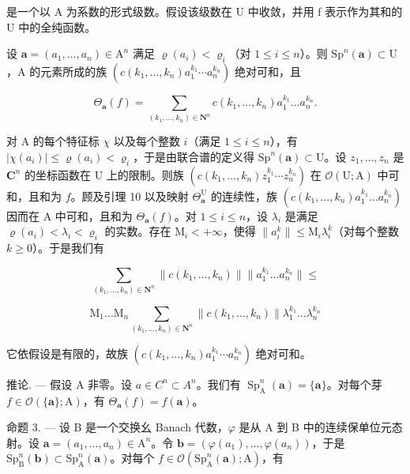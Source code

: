 是一个以 A 为系数的形式级数。假设该级数在 U 中收敛，并用 f 表示作为其和的 U 中的全纯函数。

设 \(\boldsymbol{a}=(a_{1},\ldots,a_{n})\in\mathrm{A}^{n}\) 满足 \(\varrho(a_{i})<\varrho_{i}\)（对 \(1\leqslant i\leqslant n\)）。则 \(\mathrm{Sp}^{n}(\boldsymbol{a})\subset\mathrm{U}\)，A 的元素所成的族 \((c(k_{1},\ldots,k_{n})a_{1}^{k_{1}}\cdots a_{n}^{k_{n}})\) 绝对可和，且

\[
\Theta_ {\boldsymbol {a}} (f) = \sum_ {(k _ {1}, \dots , k _ {n}) \in \mathbf {N} ^ {n}} c (k _ {1}, \dots , k _ {n}) a _ {1} ^ {k _ {1}} \dots a _ {n} ^ {k _ {n}}.
\]

对 A 的每个特征标 \(\chi\) 以及每个整数 \(i\)（满足 \(1 \leqslant i \leqslant n\)），有 \(|\chi(a_i)| \leqslant \varrho(a_i) < \varrho_i\)，于是由联合谱的定义得 \(\mathrm{Sp}^n(\boldsymbol{a}) \subset \mathrm{U}\)。设 \(z_1, \ldots, z_n\) 是 \(\mathbf{C}^n\) 的坐标函数在 U 上的限制。则族 \((c(k_1, \ldots, k_n)z_1^{k_1} \cdots z_n^{k_n})\) 在 \(\mathcal{O}(\mathrm{U}; \mathrm{A})\) 中可和，且和为 \(f\)。顾及引理 10 以及映射 \(\Theta_{\boldsymbol{a}}^{\mathrm{U}}\) 的连续性，族 \((c(k_1, \ldots, k_n)a_1^{k_1} \ldots a_n^{k_n})\) 因而在 A 中可和，且和为 \(\Theta_{\boldsymbol{a}}(f)\)。对 \(1 \leqslant i \leqslant n\)，设 \(\lambda_i\) 是满足 \(\varrho(a_i) < \lambda_i < \varrho_i\) 的实数。存在 \(\mathrm{M}_i < +\infty\)，使得 \(\|a_i^k\| \leqslant \mathrm{M}_i\lambda_i^k\)（对每个整数 \(k \geqslant 0\)）。于是我们有

\[
\sum_ {(k _ {1}, \dots , k _ {n}) \in \mathbf {N} ^ {n}} \| c (k _ {1}, \dots , k _ {n}) \| \| a _ {1} ^ {k _ {1}} \dots a _ {n} ^ {k _ {n}} \| \leqslant
\]

\[
\mathrm{M} _ {1} \dots \mathrm{M} _ {n} \sum_ {(k _ {1}, \dots , k _ {n}) \in \mathbf {N} ^ {n}} \| c (k _ {1}, \dots , k _ {n}) \| \lambda_ {1} ^ {k _ {1}} \dots \lambda_ {n} ^ {k _ {n}}
\]

它依假设是有限的，故族 \((c(k_{1},\ldots,k_{n})a_{1}^{k_{1}}\cdots a_{n}^{k_{n}})\) 绝对可和。

推论. --- 假设 A 非零。设 \(a \in C^{n} \subset A^{n}\)。我们有 \(\operatorname{Sp}_{\mathrm{A}}^{n}(\boldsymbol{a}) = \{\boldsymbol{a}\}\)。对每个芽 \(f \in \mathcal{O}(\{\boldsymbol{a}\}; \mathrm{A})\)，有 \(\Theta_{\boldsymbol{a}}(f) = f(\boldsymbol{a})\)。

命题 3. --- 设 B 是一个交换幺 Banach 代数，\(\varphi\) 是从 A 到 B 中的连续保单位元态射。设 \(\boldsymbol{a} = (a_1, \ldots, a_n) \in \mathrm{A}^n\)。令 \(\boldsymbol{b} = (\varphi(a_1), \ldots, \varphi(a_n))\)，于是 \(\mathrm{Sp}_{\mathrm{B}}^{n}(\boldsymbol{b}) \subset \mathrm{Sp}_{\mathrm{A}}^{n}(\boldsymbol{a})\)。对每个 \(f \in \mathcal{O}(\mathrm{Sp}_{\mathrm{A}}^{n}(\boldsymbol{a}); \mathrm{A})\)，有

